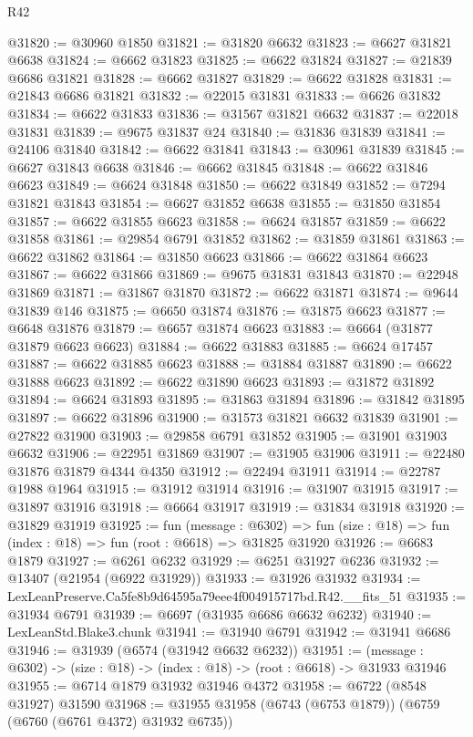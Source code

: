 \begin{lexlean}{R42}
\begin{coremodule}
{@31820 := @30960 @1850
@31821 := @31820 @6632
@31823 := @6627 @31821 @6638
@31824 := @6662 @31823
@31825 := @6622 @31824
@31827 := @21839 @6686 @31821
@31828 := @6662 @31827
@31829 := @6622 @31828
@31831 := @21843 @6686 @31821
@31832 := @22015 @31831
@31833 := @6626 @31832
@31834 := @6622 @31833
@31836 := @31567 @31821 @6632
@31837 := @22018 @31831
@31839 := @9675 @31837 @24
@31840 := @31836 @31839
@31841 := @24106 @31840
@31842 := @6622 @31841
@31843 := @30961 @31839
@31845 := @6627 @31843 @6638
@31846 := @6662 @31845
@31848 := @6622 @31846 @6623
@31849 := @6624 @31848
@31850 := @6622 @31849
@31852 := @7294 @31821 @31843
@31854 := @6627 @31852 @6638
@31855 := @31850 @31854
@31857 := @6622 @31855 @6623
@31858 := @6624 @31857
@31859 := @6622 @31858
@31861 := @29854 @6791 @31852
@31862 := @31859 @31861
@31863 := @6622 @31862
@31864 := @31850 @6623
@31866 := @6622 @31864 @6623
@31867 := @6622 @31866
@31869 := @9675 @31831 @31843
@31870 := @22948 @31869
@31871 := @31867 @31870
@31872 := @6622 @31871
@31874 := @9644 @31839 @146
@31875 := @6650 @31874
@31876 := @31875 @6623
@31877 := @6648 @31876
@31879 := @6657 @31874 @6623
@31883 := @6664 (@31877 @31879 @6623 @6623)
@31884 := @6622 @31883
@31885 := @6624 @17457
@31887 := @6622 @31885 @6623
@31888 := @31884 @31887
@31890 := @6622 @31888 @6623
@31892 := @6622 @31890 @6623
@31893 := @31872 @31892
@31894 := @6624 @31893
@31895 := @31863 @31894
@31896 := @31842 @31895
@31897 := @6622 @31896
@31900 := @31573 @31821 @6632 @31839
@31901 := @27822 @31900
@31903 := @29858 @6791 @31852
@31905 := @31901 @31903 @6632
@31906 := @22951 @31869
@31907 := @31905 @31906
@31911 := @22480 @31876 @31879 @4344 @4350
@31912 := @22494 @31911
@31914 := @22787 @1988 @1964
@31915 := @31912 @31914
@31916 := @31907 @31915
@31917 := @31897 @31916
@31918 := @6664 @31917
@31919 := @31834 @31918
@31920 := @31829 @31919
@31925 := fun (message : @6302) =>
  fun (size : @18) => fun (index : @18) => fun (root : @6618) => @31825 @31920
@31926 := @6683 @1879
@31927 := @6261 @6232
@31929 := @6251 @31927 @6236
@31932 := @13407 (@21954 (@6922 @31929))
@31933 := @31926 @31932
@31934 := LexLeanPreserve.Ca5fe8b9d64595a79eee4f004915717bd.R42.__fits_51
@31935 := @31934 @6791
@31939 := @6697 (@31935 @6686 @6632 @6232)
@31940 := LexLeanStd.Blake3.chunk
@31941 := @31940 @6791
@31942 := @31941 @6686
@31946 := @31939 (@6574 (@31942 @6632 @6232))
@31951 := (message : @6302) -> (size : @18) -> (index : @18) -> (root : @6618) -> @31933 @31946
@31955 := @6714 @1879 @31932 @31946 @4372
@31958 := @6722 (@8548 @31927) @31590
@31968 := @31955 @31958 (@6743 (@6753 @1879)) (@6759 (@6760 (@6761 @4372) @31932 @6735))
}
\end{coremodule}
\end{lexlean}
